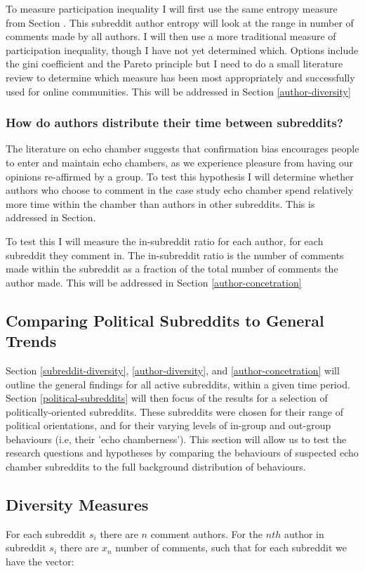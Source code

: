 To measure participation inequality I will first use the same entropy measure from Section . This subreddit author entropy will look at the range in number of comments made by all authors. I will then use a more traditional measure of participation inequality, though I have not yet determined which. Options include the gini coefficient and the Pareto principle but I need to do a small literature review to determine which measure has been most appropriately and successfully used for online communities. This will be addressed in Section \ref{author-diversity}


\subsubsection{How do authors distribute their time between subreddits?}
The literature on echo chamber suggests that confirmation bias encourages people to enter and maintain echo chambers, as we experience pleasure from having our opinions re-affirmed by a group. To test this hypothesis I will determine whether authors who choose to comment in the case study echo chamber spend relatively more time within the chamber than authors in other subreddits. This is addressed in Section.

To test this I will measure the in-subreddit ratio for each author, for each subreddit they comment in. The in-subreddit ratio is the number of comments made within the subreddit as a fraction of the total number of comments the author made. This will be addressed in Section \ref{author-concetration}

\subsection{Comparing Political Subreddits to General Trends}

Section \ref{subreddit-diversity}, \ref{author-diversity}, and \ref{author-concetration} will outline the general findings for all active subreddits, within a given time period. Section \ref{political-subreddits} will then focus of the results for a selection of politically-oriented subreddits. These subreddits were chosen for their range of political orientations, and for their varying levels of in-group and out-group behaviours (i.e, their 'echo chamberness'). This section will allow us to test the research questions and hypotheses by comparing the behaviours of suspected echo chamber subreddits to the full background distribution of behaviours.


\subsection{Diversity Measures} \label{subreddit vector}
For each subreddit $s_i$ there are $n$ comment authors. For the $nth$ author in subreddit $s_i$ there are $x_n$ number of comments, such that for each subreddit we have the vector:


